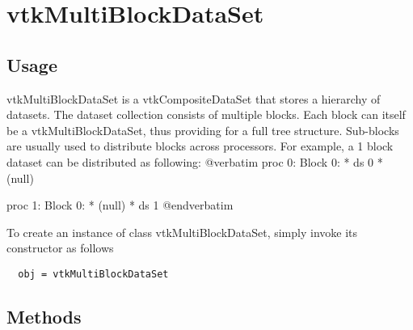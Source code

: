 \section{vtkMultiBlockDataSet}

\subsection{Usage}

 vtkMultiBlockDataSet is a vtkCompositeDataSet that stores
 a hierarchy of datasets. The dataset collection consists of
 multiple blocks. Each  block can itself be a vtkMultiBlockDataSet, thus
 providing for a full tree structure.
 Sub-blocks are usually used to distribute blocks across processors.
 For example, a 1 block dataset can be distributed as following:
 @verbatim
 proc 0:
 Block 0:
   * ds 0
   * (null)

 proc 1:
 Block 0:
   * (null)
   * ds 1
 @endverbatim

To create an instance of class vtkMultiBlockDataSet, simply
invoke its constructor as follows
\begin{verbatim}
  obj = vtkMultiBlockDataSet
\end{verbatim}
\subsection{Methods}

